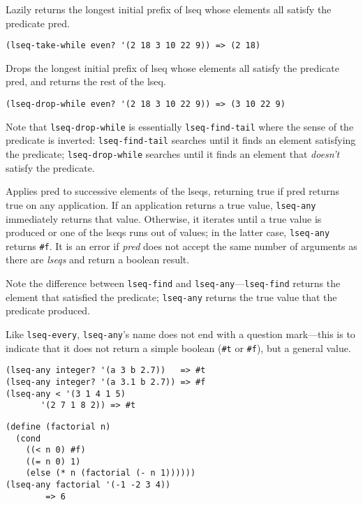 \begin{entry}{%
  }

  Lazily returns the longest initial prefix of lseq whose elements all
  satisfy the predicate pred.

\begin{verbatim}
(lseq-take-while even? '(2 18 3 10 22 9)) => (2 18)
\end{verbatim}
\end{entry}

\begin{entry}{%
  }

  Drops the longest initial prefix of lseq whose elements all satisfy
  the predicate pred, and returns the rest of the lseq.

\begin{verbatim}
(lseq-drop-while even? '(2 18 3 10 22 9)) => (3 10 22 9)
\end{verbatim}

  Note that \texttt{lseq-drop-while} is essentially
  \texttt{lseq-find-tail} where the sense of the predicate is
  inverted: \texttt{lseq-find-tail} searches until it finds an element
  satisfying the predicate; \texttt{lseq-drop-while} searches until it
  finds an element that \emph{doesn't} satisfy the predicate.
\end{entry}

\begin{entry}{%
  }

  Applies pred to successive elements of the lseqs, returning true if
  pred returns true on any application. If an application returns a
  true value, \texttt{lseq-any} immediately returns that
  value. Otherwise, it iterates until a true value is produced or one
  of the lseqs runs out of values; in the latter case,
  \texttt{lseq-any} returns \texttt{\#f}. It is an error if
  \emph{pred} does not accept the same number of arguments as there
  are \emph{lseqs} and return a boolean result.

  Note the difference between \texttt{lseq-find} and
  \texttt{lseq-any}---\texttt{lseq-find} returns the element that
  satisfied the 
  predicate; \texttt{lseq-any} returns the true value that the
  predicate produced.

  Like \texttt{lseq-every}, \texttt{lseq-any}'s name does not end with
  a question mark---this is to indicate that it does not return a
  simple boolean (\texttt{\#t} or \texttt{\#f}), but a general value.

\begin{verbatim}
(lseq-any integer? '(a 3 b 2.7))   => #t
(lseq-any integer? '(a 3.1 b 2.7)) => #f
(lseq-any < '(3 1 4 1 5)
       '(2 7 1 8 2)) => #t
\end{verbatim}

\begin{verbatim}
(define (factorial n)
  (cond
    ((< n 0) #f)
    ((= n 0) 1)
    (else (* n (factorial (- n 1))))))
(lseq-any factorial '(-1 -2 3 4))
        => 6
\end{verbatim}
\end{entry}

